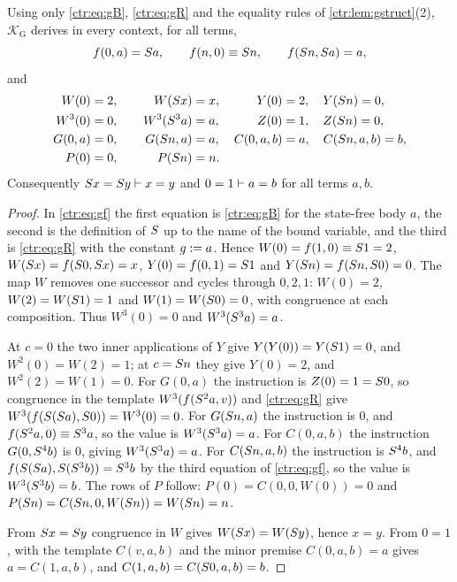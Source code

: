 \begin{lemma}\label{ctr:lem:gboot}
Using only \eqref{ctr:eq:gB}, \eqref{ctr:eq:gR} and the equality rules of
\cref{ctr:lem:gstruct}(2), $\mathcal K_{\mathrm G}$ derives in every context, for all
terms,
\begin{equation}\label{ctr:eq:gf}
 f(0,a)=S a,\qquad f(n,0)\equiv S n,\qquad f(S n,S a)=a,
\end{equation}
and
\begin{alignat*}{3}
 W(0)&=2, &\qquad W(S x)&=x, &\qquad Y(0)&=2,\quad Y(S n)=0,\\
 W^3(0)&=0, & W^3(S^3 a)&=a, & Z(0)&=1,\quad Z(S n)=0,\\
 G(0,a)&=0, & G(S n,a)&=a, & C(0,a,b)&=a,\quad C(S n,a,b)=b,\\
 P(0)&=0, & P(S n)&=n.
\end{alignat*}
Consequently $S x=S y\vdash x=y$ and $0=1\vdash a=b$ for all terms $a,b$.
\end{lemma}
\begin{proof}
In \eqref{ctr:eq:gf} the first equation is \eqref{ctr:eq:gB} for the state-free body $a$,
the second is the definition of $S$ up to the name of the bound variable, and the third
is \eqref{ctr:eq:gR} with the constant $g\mathrel{:=} a$. Hence $W(0)=f(1,0)\equiv S 1=2$,
$W(S x)=f(S 0,S x)=x$, $Y(0)=f(0,1)=S 1$ and $Y(S n)=f(S n,S 0)=0$. The
map $W$ removes one successor and cycles through $0,2,1$: $W(0)=2$, $W(2)=W(S 1)=1$ and
$W(1)=W(S 0)=0$, with congruence at each composition. Thus $W^3(0)=0$ and
$W^3(S^3a)=a$.

At $c=0$ the two inner applications of $Y$ give $Y(Y(0))=Y(S 1)=0$, and $W^2(0)=W(2)=1$;
at $c=S n$ they give $Y(0)=2$, and $W^2(2)=W(1)=0$. For $G(0,a)$ the instruction is
$Z(0)=1=S 0$, so congruence in the template $W^3(f(S^2a,v))$ and \eqref{ctr:eq:gR} give
$W^3(f(S(S a),S 0))=W^3(0)=0$. For $G(S n,a)$ the instruction is $0$, and
$f(S^2a,0)\equiv S^3a$, so the value is $W^3(S^3a)=a$. For $C(0,a,b)$ the instruction
$G(0,S^4b)$ is $0$, giving $W^3(S^3 a)=a$. For $C(S n,a,b)$ the instruction is
$S^4b$, and $f(S(S a),S(S^3b))=S^3b$ by the third equation of
\eqref{ctr:eq:gf}, so the value is $W^3(S^3b)=b$. The rows of $P$ follow:
$P(0)=C(0,0,W(0))=0$ and $P(S n)=C(S n,0,W(S n))=W(S n)=n$.

From $S x=S y$ congruence in $W$ gives $W(S x)=W(S y)$, hence $x=y$. From $0=1$,
 with the template $C(v,a,b)$ and the minor premise $C(0,a,b)=a$ gives
$a=C(1,a,b)$, and $C(1,a,b)=C(S 0,a,b)=b$.
\end{proof}

